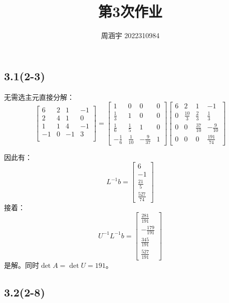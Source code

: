 \documentclass[UTF8,zihao=5]{ctexart}
\title{{\bfseries 第3次作业}}
\author{周涵宇 2022310984}
\date{}
\begin{document}
\maketitle

\subsection*{3.1(2-3)}

无需选主元直接分解：
$$
    \begin{bmatrix}
        6  & 2 & 1  & -1 \\
        2  & 4 & 1  & 0  \\
        1  & 1 & 4  & -1 \\
        -1 & 0 & -1 & 3  \\
    \end{bmatrix}
    =
    \left[\begin{array}{cccc} 1 & 0 & 0 & 0\\ \frac{1}{3} & 1 & 0 & 0\\ \frac{1}{6} & \frac{1}{5} & 1 & 0\\ -\frac{1}{6} & \frac{1}{10} & -\frac{9}{37} & 1 \end{array}\right]
    \left[\begin{array}{cccc} 6 & 2 & 1 & -1\\ 0 & \frac{10}{3} & \frac{2}{3} & \frac{1}{3}\\ 0 & 0 & \frac{37}{10} & -\frac{9}{10}\\ 0 & 0 & 0 & \frac{191}{74} \end{array}\right]
$$

因此有：
$$
    L^{-1}b=
    \left[\begin{array}{c} 6\\ -1\\ \frac{21}{5}\\ \frac{527}{74} \end{array}\right]
$$
接着：
$$
    U^{-1}L^{-1}b=
    \left[\begin{array}{c} \frac{281}{191}\\ -\frac{179}{191}\\ \frac{345}{191}\\ \frac{527}{191} \end{array}\right]
$$
是解。同时$\det{A}=\det{U}=191$。

\subsection*{3.2(2-8)}
\end{document}
